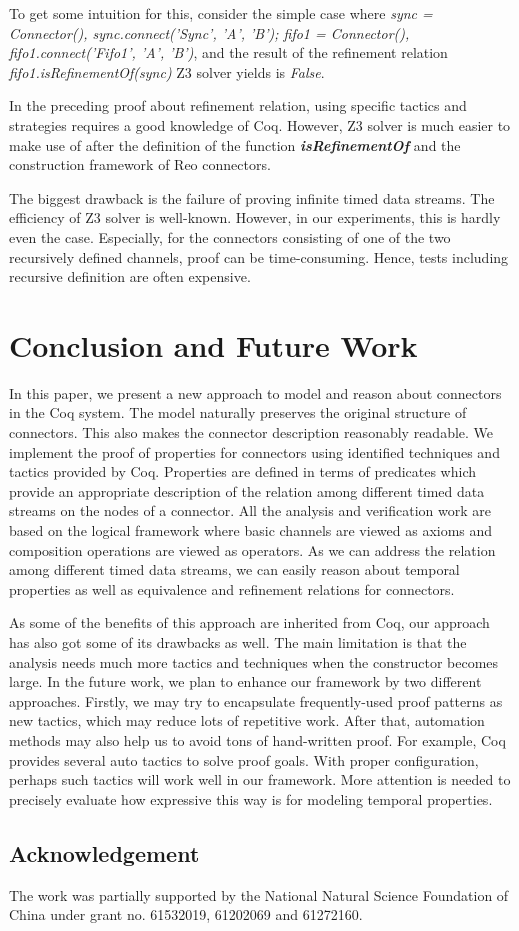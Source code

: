 \documentclass{llncs}
\begin{document}
To get some intuition for this, consider the simple case where \emph{sync = Connector(), sync.connect('Sync', 'A', 'B'); fifo1 = Connector(),
fifo1.connect('Fifo1', 'A', 'B')}, and the result of the refinement relation \emph{fifo1.isRefinementOf(sync)} Z3 solver yields is \emph{False}.

In the preceding proof about refinement relation, using specific tactics and strategies requires a good knowledge of Coq. However, Z3 solver is much easier to make use of after the definition of the function \textbf{\emph{isRefinementOf}} and the construction framework of Reo connectors.

The biggest drawback is the failure of proving infinite timed data streams. The efficiency of Z3 solver is well-known. However, in our experiments, this is hardly even the case. Especially, for the connectors consisting of one of the two recursively defined channels, proof can be time-consuming. Hence, tests including recursive definition are often expensive.
\section{Conclusion and Future Work}\label{sec:conclusion}
In this paper, we present a new approach to model and reason about connectors in the Coq system. The model naturally
preserves the original structure of connectors. This also makes the connector description reasonably readable. We
implement the proof of properties for connectors using identified techniques and tactics provided by Coq. Properties are
defined in terms of predicates which provide an appropriate description of the relation among different
timed data streams on the nodes of a connector. All the analysis and verification work are based on the logical framework
where basic channels are viewed as axioms and composition operations are viewed as operators. As we can address
the relation among different timed data streams, we can easily reason about temporal properties as well as equivalence
and refinement relations for connectors.

As some of the benefits of this approach are inherited from Coq, our approach has also got some of its drawbacks as well.
The main limitation is that the analysis needs much more tactics and techniques when the constructor becomes large.
In the future work, we plan to enhance our framework by two different approaches. Firstly, we may try to encapsulate
frequently-used proof patterns as new tactics, which may reduce lots of repetitive work. After that, automation methods
may also help us to avoid tons of hand-written proof. For example, Coq provides several auto tactics to solve proof
goals. With proper configuration, perhaps such tactics will work well in our framework. More attention is needed to precisely
evaluate how expressive this way is for modeling temporal properties.

\subsection*{Acknowledgement}
\noindent The work was partially supported by the National Natural Science Foundation of China under grant no. 61532019, 61202069 and 61272160.



\end{document}
